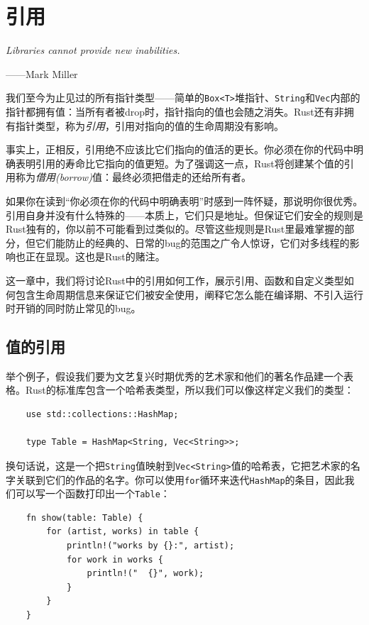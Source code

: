 \chapter{引用}\label{ch05}

\emph{Libraries cannot provide new inabilities.}

\begin{flushright}
——Mark Miller
\end{flushright}

我们至今为止见过的所有指针类型——简单的\texttt{Box<T>}堆指针、\texttt{String}和\texttt{Vec}内部的指针都拥有值：当所有者被drop时，指针指向的值也会随之消失。Rust还有非拥有指针类型，称为\emph{引用}，引用对指向的值的生命周期没有影响。

事实上，正相反，引用绝不应该比它们指向的值活的更长。你必须在你的代码中明确表明引用的寿命比它指向的值更短。为了强调这一点，Rust将创建某个值的引用称为\emph{借用(borrow)}值：最终必须把借走的还给所有者。

如果你在读到“你必须在你的代码中明确表明”时感到一阵怀疑，那说明你很优秀。引用自身并没有什么特殊的——本质上，它们只是地址。但保证它们安全的规则是Rust独有的，你以前不可能看到过类似的。尽管这些规则是Rust里最难掌握的部分，但它们能防止的经典的、日常的bug的范围之广令人惊讶，它们对多线程的影响也正在显现。这也是Rust的赌注。

这一章中，我们将讨论Rust中的引用如何工作，展示引用、函数和自定义类型如何包含生命周期信息来保证它们被安全使用，阐释它怎么能在编译期、不引入运行时开销的同时防止常见的bug。

\section{值的引用}

举个例子，假设我们要为文艺复兴时期优秀的艺术家和他们的著名作品建一个表格。Rust的标准库包含一个哈希表类型，所以我们可以像这样定义我们的类型：
\begin{verbatim}
    use std::collections::HashMap;

    type Table = HashMap<String, Vec<String>>;
\end{verbatim}

换句话说，这是一个把\texttt{String}值映射到\texttt{Vec<String>}值的哈希表，它把艺术家的名字关联到它们的作品的名字。你可以使用\texttt{for}循环来迭代\texttt{HashMap}的条目，因此我们可以写一个函数打印出一个\texttt{Table}：
\begin{verbatim}
    fn show(table: Table) {
        for (artist, works) in table {
            println!("works by {}:", artist);
            for work in works {
                println!("  {}", work);
            }
        }
    }
\end{verbatim}

